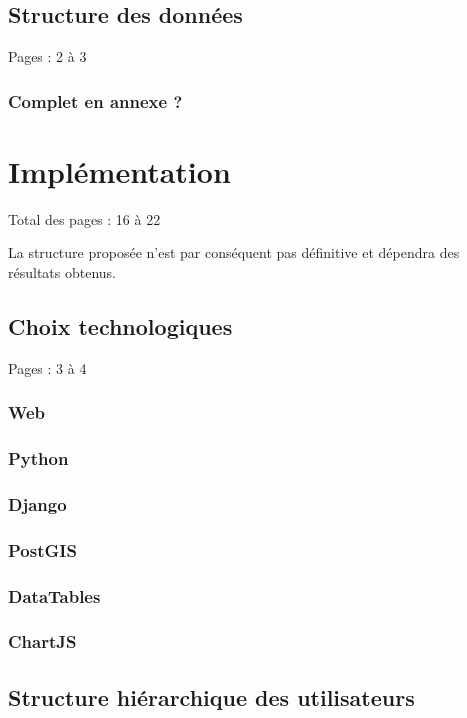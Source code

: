 \documentclass{eplmastersthesis_FR}
\begin{document}
		\section{Structure des données}

			Pages : 2 à 3

			\subsection*{Complet en annexe ?}

	\chapter{Implémentation}

		Total des pages : 16 à 22

		La structure proposée n'est par conséquent pas définitive et dépendra des résultats obtenus.

		\section{Choix technologiques}

			Pages : 3 à 4

			\subsection*{Web}
			\subsection*{Python}
			\subsection*{Django}
			\subsection*{PostGIS}
			\subsection*{DataTables}
			\subsection*{ChartJS}

		\section{Structure hiérarchique des utilisateurs}
\end{document}
